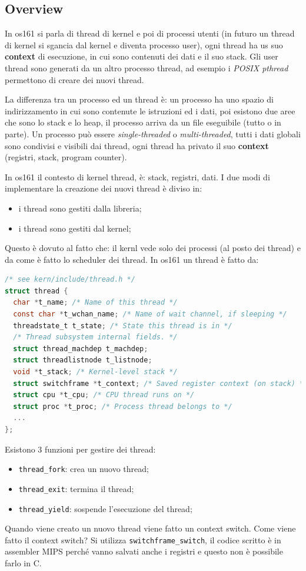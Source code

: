 \documentclass[12pt]{article}
\begin{document}
\subsection{Overview}
In os161 si parla di thread di kernel e poi di processi utenti (in futuro un thread di kernel si sgancia dal kernel e diventa processo user), ogni thread ha us suo \textbf{context} di esecuzione, in cui sono contenuti dei dati e il suo stack. Gli user thread sono generati da un altro processo thread, ad esempio i \emph{POSIX pthread} permettono di creare dei nuovi thread.

La differenza tra un processo ed un thread \`e:
un processo ha uno spazio di indirizzamento in cui sono contenute le istruzioni ed i dati, poi esistono due aree che sono lo stack e lo heap, il processo arriva da un file eseguibile (tutto o in parte). Un processo pu\`o essere \emph{single-threaded} o \emph{multi-threaded}, tutti i dati globali sono condivisi e visibili dai thread, ogni thread ha privato il suo \textbf{context} (registri, stack, program counter).

In os161 il contesto di kernel thread, \`e: stack, registri, dati. I due modi di implementare la creazione dei nuovi thread \`e diviso in:
\begin{itemize}
  \item i thread sono gestiti dalla libreria;
  \item i thread sono gestiti dal kernel;
\end{itemize}
Questo \`e dovuto al fatto che: il kernl vede solo dei processi (al posto dei thread) e da come \`e fatto lo scheduler dei thread. In os161 un thread \`e fatto da:
\begin{lstlisting}[language=c]
/* see kern/include/thread.h */
struct thread {
  char *t_name; /* Name of this thread */
  const char *t_wchan_name; /* Name of wait channel, if sleeping */
  threadstate_t t_state; /* State this thread is in */
  /* Thread subsystem internal fields. */
  struct thread_machdep t_machdep;
  struct threadlistnode t_listnode;
  void *t_stack; /* Kernel-level stack */
  struct switchframe *t_context; /* Saved register context (on stack) */
  struct cpu *t_cpu; /* CPU thread runs on */
  struct proc *t_proc; /* Process thread belongs to */
  ...
};
\end{lstlisting}
Esistono 3 funzioni per gestire dei thread:
\begin{itemize}
  \item \texttt{thread\_fork}: crea un nuovo thread;
  \item \texttt{thread\_exit}: termina il thread;
  \item \texttt{thread\_yield}: sospende l'esecuzione del thread;
\end{itemize}
Quando viene creato un nuovo thread viene fatto un context switch. Come viene fatto il context switch? Si utilizza \texttt{switchframe\_switch}, il codice scritto \`e in assembler MIPS perch\'e vanno salvati anche i registri e questo non \`e possibile farlo in C.
\end{document}
